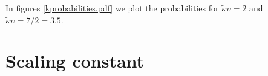 \documentclass[lettersize,journal]{IEEEtran}
\begin{document}
In figures \ref{kprobabilities.pdf} we plot the probabilities for $\tilde{\kappa}\upsilon=2$ and  $\tilde{\kappa}\upsilon=7/2=3.5$.








\appendices




\section{Scaling constant}







%

\end{document}
